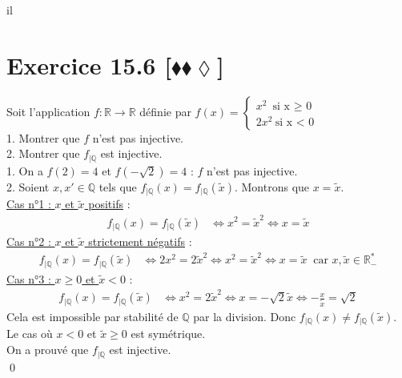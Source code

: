il\documentclass[10pt]{article}
\begin{document}
\section*{Exercice 15.6 [$\blacklozenge\blacklozenge\lozenge$]}
\begin{tcolorbox}[enhanced, width=7.6in, center, size=fbox, fontupper=\large, drop shadow southwest]
    Soit l'application $f:\mathbb{R} \to \mathbb{R}$ définie par $f(x)=\begin{cases}x^2 ~ \text{si x $\geq$ 0} \\ 2x^2 ~ \text{si x < 0}\end{cases}$\\
    1. Montrer que $f$ n'est pas injective.\\
    2. Montrer que $f_{|\mathbb{Q}}$ est injective.\\[0.2cm]
    1. On a $f(2) = 4$ et $f(-\sqrt{2}) = 4$ : $f$ n'est pas injective.\\
    2. Soient $x,x'\in\mathbb{Q}$ tels que $f_{|\mathbb{Q}}(x)=f_{|\mathbb{Q}}(\widetilde{x})$. Montrons que $x=\widetilde{x}$.\\
    \underline{Cas n°1 : $x$ et $\widetilde{x}$ positifs} :
    \begin{align*}
        f_{|\mathbb{Q}}(x) = f_{|\mathbb{Q}}(\widetilde{x}) &\iff x^2 = \widetilde{x}^2 \iff x = \widetilde{x}
    \end{align*}
    \underline{Cas n°2 : $x$ et $\widetilde{x}$ strictement négatifs} :
    \begin{align*}
        f_{|\mathbb{Q}}(x) = f_{|\mathbb{Q}}(\widetilde{x}) &\iff 2x^2 = 2\widetilde{x}^2 \iff x^2 = \widetilde{x}^2 \iff x = \widetilde{x} ~ \text{ car $x,\widetilde{x}\in\mathbb{R}^*_-$}
    \end{align*}
    \underline{Cas n°3 : $x\geq0$ et $\widetilde{x}<0$} :
    \begin{align*}
        f_{|\mathbb{Q}}(x) = f_{|\mathbb{Q}}(\widetilde{x}) &\iff x^2 = 2\widetilde{x}^2 \iff x = -\sqrt{2}\widetilde{x} \iff -\frac{x}{\widetilde{x}}=\sqrt{2}
    \end{align*}
    Cela est impossible par stabilité de $\mathbb{Q}$ par la division. Donc $f_{|\mathbb{Q}}(x) \neq f_{|\mathbb{Q}}(\widetilde{x})$.\\
    Le cas où $x < 0$ et $\widetilde{x}\geq0$ est symétrique.\\
    On a prouvé que $f_{|\mathbb{Q}}$ est injective.\\
    \qed
\end{tcolorbox}
\end{document}
